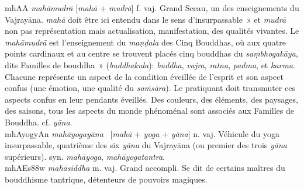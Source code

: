 \documentclass[a4paper,11pt,twocolumn]{article}
\begin{document}
{\dn mhAA} {\em mah\={a}mudr\={a}} [{\em mah\={a}} + {\em
mudr\={a}}] f. vaj. \og Grand Sceau\fg, un des enseignements du
Vajray\={a}na. {\em mah\={a}} doit être ici entendu dans le sens
d'\og insurpassable~» et {\em mudr\={a}} non pas représentation mais
actualisation, manifestation, des qualités vivantes. Le {\em
mah\={a}mudr\={a}} est l'enseignement du {\em ma\d{n}\d{d}ala} des
Cinq Bouddhas, où aux quatre points cardinaux et au centre
se trouvent placés cinq bouddhas du {\em sa\d{m}bhogak\={a}ya}, dits
\og Familles de bouddha~» ({\em buddhakula}): {\em buddha}, {\em vajra},
{\em ratna}, {\em padma}, et {\em karma}. Chacune représente un aspect
de la condition éveillée de l'esprit et son aspect confus (une
émotion, une qualité du {\em sa\.{m}s\={a}ra}). Le pratiquant doit
transmuter ces aspects confus en leur pendants éveillés. Des couleurs,
des éléments, des paysages, des saisons, tous les aspects du monde
phénoménal sont associés aux Familles de Bouddha.  cf. {\em
y\={a}na}. \\


{\dn mhAyogyAn} {\em mah\={a}yogay\={a}na} \ [{\em mah\={a}} +
{\em yoga} + {\em y\={a}na}]  n. vaj. \og Véhicule du yoga
insurpassable\fg, quatrième des six  {\em y\={a}na} du Vajray\={a}na
(ou premier des trois {\em y\={a}na} supérieurs). syn. {\em mah\={a}yoga},
{\em mah\={a}yogatantra}. \\

{\dn mhAEs\388w} {\em mah\={a}siddha} m. vaj. \og Grand accompli\fg. Se
dit de certains maîtres du bouddhisme tantrique, détenteurs de
pouvoirs magiques. \\


\end{document}
